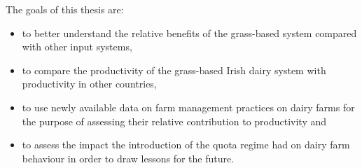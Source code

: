 \documentclass[12pt]{report}
\begin{document}
The goals of this thesis are:
\begin{itemize}
\item  to better understand the relative benefits of the grass-based system compared with other input systems,
\item  to compare the productivity of the grass-based Irish dairy system with productivity in other countries,
\item  to use newly available data on farm management practices on dairy farms for the purpose of assessing their relative contribution to productivity and
\item  to assess the impact the introduction of the quota regime had on dairy farm behaviour in order to draw lessons for the future. 
\end{itemize}


\end{document}
